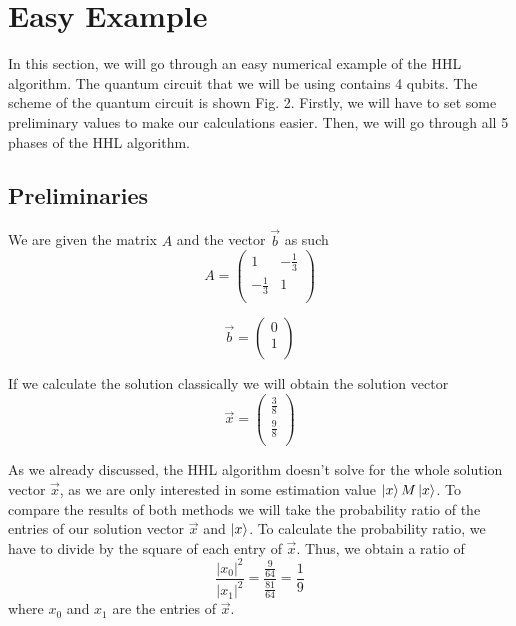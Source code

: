 \section{Easy Example}

In this section, we will go through an easy numerical example of the HHL algorithm.
The quantum circuit that we will be using contains 4 qubits.
The scheme of the quantum circuit is shown Fig. 2.
Firstly, we will have to set some preliminary values to make our calculations easier. 
Then, we will go through all 5 phases of the HHL algorithm. 

\subsection{Preliminaries}
We are given the matrix $A$ and the vector $\vec{b}$ as such
\begin{equation}
   A = \begin{pmatrix} 1 & -\frac{1}{3}\\ -\frac{1}{3} & 1\\ \end{pmatrix}
\end{equation}

\begin{equation}
    \vec{b} = \begin{pmatrix} 0 \\ 1\\ \end{pmatrix}
\end{equation}

If we calculate the solution classically we will obtain the solution vector 
\begin{equation}
\vec{x} = \begin{pmatrix} \frac{3}{8}\\ \frac{9}{8}\\ \end{pmatrix}
\end{equation}

As we already discussed, the HHL algorithm doesn't solve for the whole solution vector $\vec{x}$, as we are only interested in some estimation value $\ket x M \ket x$.
To compare the results of both methods we will take the probability ratio of the entries of our solution vector $\vec x$ and $\ket x$.
To calculate the probability ratio, we have to divide by the square of each entry of $\vec{x}$.
Thus, we obtain a ratio of
\begin{equation}
    \frac{ |x_0|^2}{ |x_1|^2}= \frac{\frac{9}{64}}{\frac{81}{64}} = \frac{1}{9}
\end{equation}
where $x_0$ and $x_1$ are the entries of $\vec x$.

